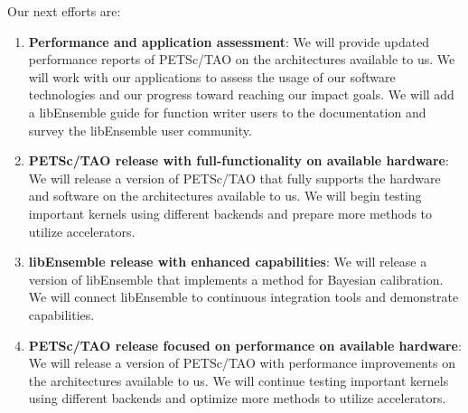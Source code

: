 Our next efforts are:
\begin{enumerate}
  \item \textbf{Performance and application assessment}: 
  We will provide updated performance reports of PETSc/TAO on the architectures available to us.
  We will work with our applications to assess the usage of our software technologies and our 
  progress toward reaching our impact goals.
  We will add a libEnsemble guide for function writer users to the documentation and survey 
  the libEnsemble user community.
  \item \textbf{PETSc/TAO release with full-functionality on available hardware}:
  We will release a version of PETSc/TAO that fully supports the hardware and software on the 
  architectures available to us. 
  We will begin testing important kernels using different backends and prepare more methods to utilize accelerators.
  \item \textbf{libEnsemble release with enhanced capabilities}:
  We will release a version of libEnsemble that implements a method for Bayesian calibration. 
  We will connect libEnsemble to continuous integration tools and demonstrate capabilities.
  \item \textbf{PETSc/TAO release focused on performance on available hardware}:
  We will release a version of PETSc/TAO with performance improvements on the architectures available to us. 
  We will continue testing important kernels using different backends and optimize more methods to 
  utilize accelerators.
\end{enumerate}

